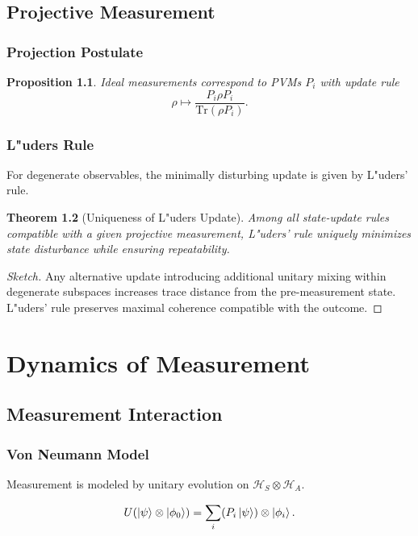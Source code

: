 \documentclass[12pt]{book}
\theoremstyle{plain}
\newtheorem{theorem}{Theorem}[chapter]
\newtheorem{proposition}[theorem]{Proposition}
\theoremstyle{definition}
\theoremstyle{remark}
\begin{document}
\chapter{Projective Measurement}

\section{Projection Postulate}

\begin{proposition}
Ideal measurements correspond to PVMs ${P_i}$ with update rule
\[
\rho \mapsto \frac{P_i \rho P_i}{\mathrm{Tr}(\rho P_i)}.
\]
\end{proposition}

\section{L"uders Rule}
For degenerate observables, the minimally disturbing update is given by L"uders' rule.

\begin{theorem}[Uniqueness of L"uders Update]
Among all state-update rules compatible with a given projective measurement, L"uders' rule uniquely minimizes state disturbance while ensuring repeatability.
\end{theorem}

\begin{proof}[Sketch]
Any alternative update introducing additional unitary mixing within degenerate subspaces increases trace distance from the pre-measurement state. L"uders' rule preserves maximal coherence compatible with the outcome.
\end{proof}

\part{Dynamics of Measurement}

\chapter{Measurement Interaction}

\section{Von Neumann Model}
Measurement is modeled by unitary evolution on $\mathcal{H}_S \otimes \mathcal{H}_A$.

\begin{equation}
U(\ket{\psi}\otimes\ket{\phi_0}) = \sum_i (P_i \ket{\psi}) \otimes \ket{\phi_i}.
\end{equation}
\end{document}
